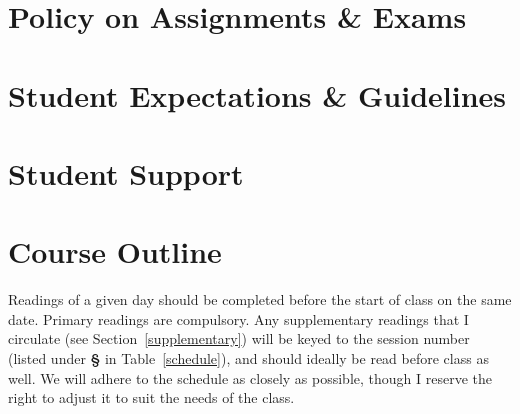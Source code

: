 \documentclass[titlepage]{article}
\newcommand\policy{../policy}
\begin{document}


\section{Policy on Assignments \& Exams}
\label{policy}





\section{Student Expectations \& Guidelines}
\label{expectations}





\section{Student Support}
\label{support}




\section{Course Outline}
\label{outline}

Readings of a given day should be completed before the start of class
on the same date. Primary readings are compulsory. Any supplementary
readings that I circulate (see Section~\ref{supplementary}) will
be keyed to the session number (listed under \textbf{\S} in
Table~\ref{schedule}), and should ideally be read before class as well.
We will adhere to the schedule as closely as possible, though I reserve
the right to adjust it to suit the needs of the class.

\newcommand\Yhwh{\textsc{Yhwh}}
\newcommand\rarr{\char"2192\hspace*{0.5pt}}
\end{document}
